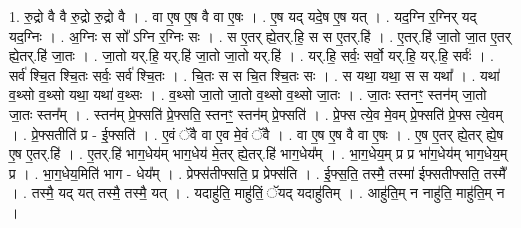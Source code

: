 \documentclass[17pt]{extarticle}
\begin{document}
1. रु॒द्रो वै वै रु॒द्रो रु॒द्रो वै । . वा ए॒ष ए॒ष वै वा ए॒षः । . ए॒ष यद् यदे॒ष ए॒ष यत् । . यद॒ग्नि र॒ग्निर् यद् यद॒ग्निः । . अ॒ग्निः स सो᳚ ऽग्नि र॒ग्निः सः । . स ए॒तर् ह्ये॒तर्.हि॒ स स ए॒तर्.हि॑ । . ए॒तर्.हि॑ जा॒तो जा॒त ए॒तर् ह्ये॒तर्.हि॑ जा॒तः । . जा॒तो यर्.हि॒ यर्.हि॑ जा॒तो जा॒तो यर्.हि॑ । . यर्.हि॒ सर्वः॒ सर्वो॒ यर्.हि॒ यर्.हि॒ सर्वः॑ । . सर्व॑ श्चि॒त श्चि॒तः सर्वः॒ सर्व॑ श्चि॒तः । . चि॒तः स स चि॒त श्चि॒तः सः । . स यथा॒ यथा॒ स स यथा᳚ । . यथा॑ व॒थ्सो व॒थ्सो यथा॒ यथा॑ व॒थ्सः । . व॒थ्सो जा॒तो जा॒तो व॒थ्सो व॒थ्सो जा॒तः । . जा॒तः स्तनꣳ॒॒ स्तन॑म् जा॒तो जा॒तः स्तन᳚म् । . स्तन॑म् प्रे॒फ्सति॑ प्रे॒फ्सति॒ स्तनꣳ॒॒ स्तन॑म् प्रे॒फ्सति॑ । . प्रे॒फ्स त्ये॒व मे॒वम् प्रे॒फ्सति॑ प्रे॒फ्स त्ये॒वम् । . प्रे॒फ्सतीति॑ प्र - ई॒फ्सति॑ । . ए॒वं ॅवै वा ए॒व मे॒वं ॅवै । . वा ए॒ष ए॒ष वै वा ए॒षः । . ए॒ष ए॒तर् ह्ये॒तर् ह्ये॒ष ए॒ष ए॒तर्.हि॑ । . ए॒तर्.हि॑ भाग॒धेय॑म् भाग॒धेय॑ मे॒तर् ह्ये॒तर्.हि॑ भाग॒धेय᳚म् । . भा॒ग॒धेय॒म् प्र प्र भा॑ग॒धेय॑म् भाग॒धेय॒म् प्र । . भा॒ग॒धेय॒मिति॑ भाग - धेय᳚म् । . प्रेफ्स॑तीफ्सति॒ प्र प्रेफ्स॑ति । . ई॒फ्स॒ति॒ तस्मै॒ तस्मा॑ ईफ्सतीफ्सति॒ तस्मै᳚ । . तस्मै॒ यद् यत् तस्मै॒ तस्मै॒ यत् । . यदाहु॑ति॒ माहु॑तिं॒ ॅयद् यदाहु॑तिम् । . आहु॑ति॒म् न नाहु॑ति॒ माहु॑ति॒म् न । \newline
\end{document}
